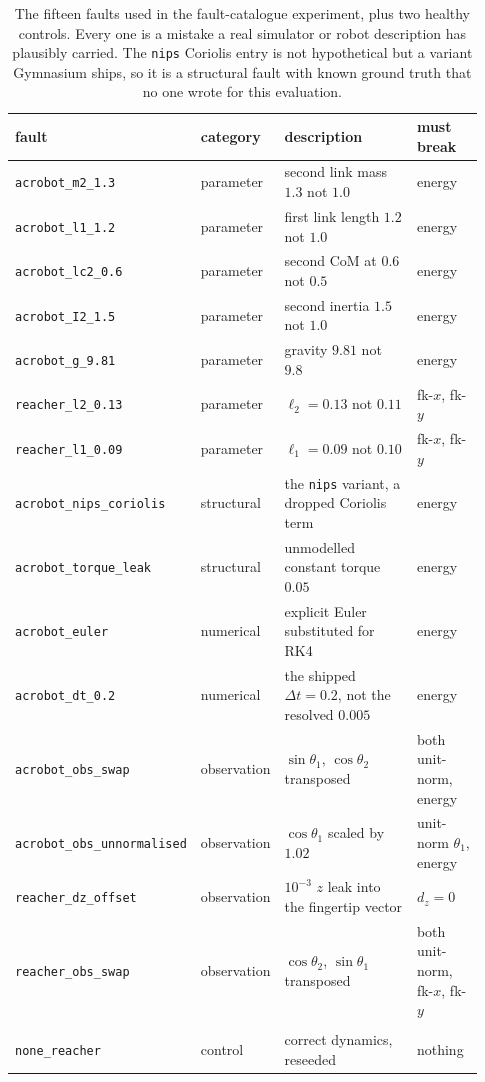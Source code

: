 \documentclass{article}
\begin{document}
\begin{table}[t]
\caption{The fifteen faults used in the fault-catalogue experiment, plus two healthy controls.
Every one is a mistake a real simulator or robot description has plausibly
carried. The \texttt{nips} Coriolis entry is not hypothetical but a variant
Gymnasium ships, so it is a structural fault with known ground truth that
no one wrote for this evaluation.}
\label{tab:faults}
\begin{center}
\small
\footnotesize
\begin{tabular}{@{}p{0.25\linewidth}@{}p{0.12\linewidth}@{}
p{0.40\linewidth}@{}>{\raggedright\arraybackslash}p{0.16\linewidth}@{}}
fault & category & description & must break \\
\hline
\texttt{acrobot\_m2\_1.3}   & parameter & second link mass $1.3$ not $1.0$
  & energy \\
\texttt{acrobot\_l1\_1.2}   & parameter & first link length $1.2$ not $1.0$
  & energy \\
\texttt{acrobot\_lc2\_0.6}  & parameter & second CoM at $0.6$ not $0.5$
  & energy \\
\texttt{acrobot\_I2\_1.5}   & parameter & second inertia $1.5$ not $1.0$
  & energy \\
\texttt{acrobot\_g\_9.81}   & parameter & gravity $9.81$ not $9.8$ & energy \\
\texttt{reacher\_l2\_0.13}  & parameter & $\ell_2 = 0.13$ not $0.11$
  & fk-$x$, fk-$y$ \\
\texttt{reacher\_l1\_0.09}  & parameter & $\ell_1 = 0.09$ not $0.10$
  & fk-$x$, fk-$y$ \\
\hline
\texttt{acrobot\_nips\_coriolis} & structural & the \texttt{nips} variant, a
  dropped Coriolis term & energy \\
\texttt{acrobot\_torque\_leak}   & structural & unmodelled constant torque
  $0.05$ & energy \\
\hline
\texttt{acrobot\_euler}     & numerical & explicit Euler substituted for RK4
  & energy \\
\texttt{acrobot\_dt\_0.2}   & numerical & the shipped $\Delta t = 0.2$, not
  the resolved $0.005$ & energy \\
\hline
\texttt{acrobot\_obs\_swap} & observation & $\sin\theta_1$, $\cos\theta_2$
  transposed & both unit-norm, energy \\
\texttt{acrobot\_obs\_unnormalised} & observation & $\cos\theta_1$ scaled by
  $1.02$ & unit-norm $\theta_1$, energy \\
\texttt{reacher\_dz\_offset} & observation & $10^{-3}$ $z$ leak into the
  fingertip vector & $d_z = 0$ \\
\texttt{reacher\_obs\_swap} & observation & $\cos\theta_2$, $\sin\theta_1$
  transposed & both unit-norm, fk-$x$, fk-$y$ \\
\hline
\shortstack[l]{\texttt{none\_acrobot}\\\texttt{none\_reacher}} & control & correct dynamics,
  reseeded & nothing \\
\end{tabular}
\end{center}
\end{table}
\end{document}
